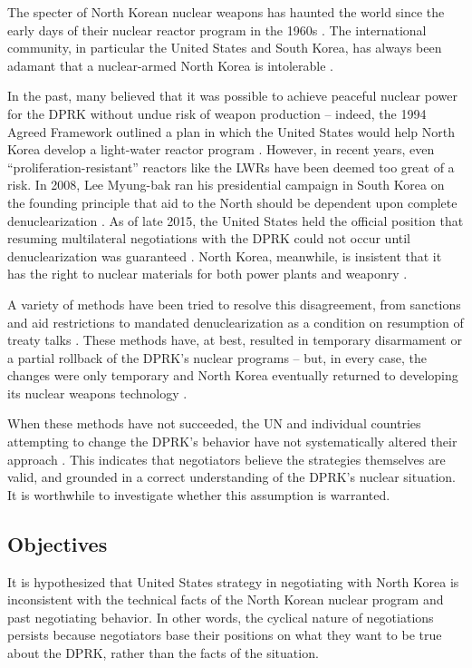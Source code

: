 \documentclass{article}
\begin{document}
The specter of North Korean nuclear weapons has haunted the world since the early days of their nuclear reactor program in the 1960s \cite{pincus}. The international community, in particular the United States and South Korea, has always been adamant that a nuclear-armed North Korea is intolerable \cite{kerry,parksk}.

In the past, many believed that it was possible to achieve peaceful nuclear power for the DPRK without undue risk of weapon production – indeed, the 1994 Agreed Framework outlined a plan in which the United States would help North Korea develop a light-water reactor program \cite{agreed}. However, in recent years, even “proliferation-resistant” reactors like the LWRs have been deemed too great of a risk. In 2008, Lee Myung-bak ran his presidential campaign in South Korea on the founding principle that aid to the North should be dependent upon complete denuclearization \cite{snyder}. As of late 2015, the United States held the official position that resuming multilateral negotiations with the DPRK could not occur until denuclearization was guaranteed \cite{pennington}. North Korea, meanwhile, is insistent that it has the right to nuclear materials for both power plants and weaponry \cite{kcna}. 

A variety of methods have been tried to resolve this disagreement, from sanctions and aid restrictions to mandated denuclearization as a condition on resumption of treaty talks \cite{bajoria,davenport}. These methods have, at best, resulted in temporary disarmament or a partial rollback of the DPRK’s nuclear programs – but, in every case, the changes were only temporary and North Korea eventually returned to developing its nuclear weapons technology \cite{davenport,nti15,iaea09}.

When these methods have not succeeded, the UN and individual countries attempting to change the DPRK’s behavior have not systematically altered their approach \cite{davenport,nti15}. This indicates that negotiators believe the strategies themselves are valid, and grounded in a correct understanding of the DPRK’s nuclear situation. It is worthwhile to investigate whether this assumption is warranted.

\subsection{Objectives}

It is hypothesized that United States strategy in negotiating with North Korea is inconsistent with the technical facts of the North Korean nuclear program and past negotiating behavior. In other words, the cyclical nature of negotiations persists because negotiators base their positions on what they want to be true about the DPRK, rather than the facts of the situation. 
\end{document}

